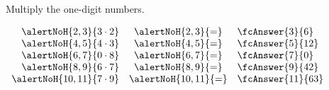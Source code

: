 \begin{frame}

\vskip -0.1cm

\begin{example}Multiply the one-digit numbers.

\hfil\hfil$\begin{array}{rcl}\alertNoH{2, 3}{{3\cdot2}}&\alertNoH{2, 3}{{=}}&\fcAnswer{3}{{6}}\\\alertNoH{4, 5}{{4\cdot3}}&\alertNoH{4, 5}{{=}}&\fcAnswer{5}{{12}}\\\alertNoH{6, 7}{{0\cdot8}}&\alertNoH{6, 7}{{=}}&\fcAnswer{7}{{0}}\\\alertNoH{8, 9}{{6\cdot7}}&\alertNoH{8, 9}{{=}}&\fcAnswer{9}{{42}}\\\alertNoH{10, 11}{{7\cdot9}}&\alertNoH{10, 11}{{=}}&\fcAnswer{11}{{63}}\\\end{array}$\end{example}\vskip 10cm\end{frame}